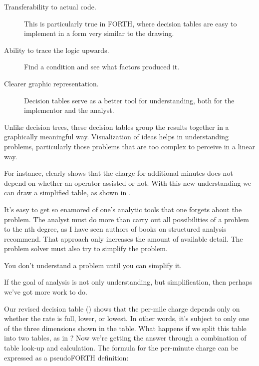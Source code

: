 \begin{description}
\item[Transferability to actual code.] This is particularly true in FORTH,
where decision tables are easy to implement in a form very similar to the
drawing.

\item[Ability to trace the logic upwards.] Find a condition and see what
factors produced it.

\item[Clearer graphic representation.] Decision tables serve as a better tool
for understanding, both for the implementor and the analyst.
\end{description}

Unlike decision trees, these decision tables group the results
together in a graphically meaningful way. Visualization of ideas helps in
understanding problems, particularly those problems that are too
complex to perceive in a linear way.

For instance,  clearly shows that the charge for
additional minutes does not depend on whether an operator assisted or not.
With this new understanding we can draw a simplified table, as shown
in .



It's easy to get so enamored of one's analytic tools that one forgets
about the problem. The analyst must do more than carry out all
possibilities of a problem to the nth degree, as I have seen authors of
books on structured analysis recommend. That approach only increases
the amount of available detail. The problem solver must also try to
simplify the problem.

\begin{tip}
You don't understand a problem until you can simplify it.
\end{tip}

\noindent If the goal of analysis is not only understanding, but simplification, then
perhaps we've got more work to do.

Our revised decision table () shows that the per-mile
charge depends only on whether the rate is full, lower, or lowest. In other
words, it's subject to only one of the three dimensions shown in the table.
What happens if we split this table into two tables, as in ?
Now we're getting the answer through a combination of table look-up
and calculation. The formula for the per-minute charge can be
expressed as a pseudoFORTH definition:

